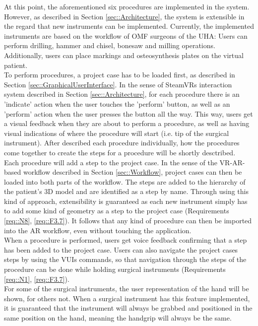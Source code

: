 At this point, the aforementioned six procedures are implemented in the system.
However, as described in Section \ref{sec::Architecture}, the system is extensible in the regard that new instruments can be implemented.
Currently, the implemented instruments are based on the workflow of OMF surgeons of the UHA: Users can perform drilling, hammer and chisel, bonesaw and milling operations.
Additionally, users can place markings and osteosynthesis plates on the virtual patient.
\\ To perform procedures, a project case has to be loaded first, as described in Section \ref{sec::GraphicalUserInterface}.
In the sense of SteamVRs interaction system described in Section \ref{sec::Architecture}, for each procedure there is an 'indicate' action when the user touches the 'perform' button, as well as an 'perform' action when the user presses the button all the way.
This way, users get a visual feedback when they are about to perform a procedure, as well as having visual indications of where the procedure will start (i.e. tip of the surgical instrument).
After described each procedure individually, how the procedures come together to create the steps for a procedure will be shortly desctribed.
\\ Each procedure will add a step to the project case.
In the sense of the VR-AR-based workflow described in Section \ref{sec::Workflow}, project cases can then be loaded into both parts of the workflow.
The steps are added to the hierarchy of the patient's 3D model and are identified as a step by name.
Through using this kind of approach, extensibility is guaranteed as each new instrument simply has to add some kind of geometry as a step to the project case (Requirements \ref{req::N8}, \ref{req::F3.7}).
It follows that any kind of procedure can then be imported into the AR workflow, even without touching the application.
\\ When a procedure is performed, users get voice feedback confirming that a step has been added to the project case.
Users can also navigate the project cases steps by using the VUIs commands, so that navigation through the steps of the procedure can be done while holding surgical instruments (Requirements \ref{req::N1}, \ref{req::F3.7}).
\\ For some of the surgical instruments, the user representation of the hand will be shown, for others not.
When a surgical instrument has this feature implemented, it is guaranteed that the instrument will always be grabbed and positioned in the same position on the hand, meaning the handgrip will always be the same.
